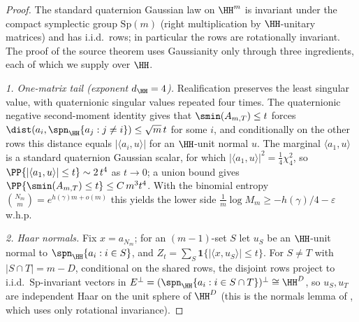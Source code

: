 \begin{proof}
The standard quaternion Gaussian law on $\HH^m$ is invariant under the compact
symplectic group $\mathrm{Sp}(m)$ (right multiplication by $\HH$-unitary matrices)
and has i.i.d.\ rows; in particular the rows are rotationally invariant.  The proof
of the source theorem \cite{ShmaloExtremal2026} uses Gaussianity only through three
ingredients, each of which we supply over $\HH$.

\emph{1. One-matrix tail (exponent $d_\HH=4$).}  Realification preserves the
least singular value, with quaternionic singular values repeated four times.
The quaternionic negative second-moment identity gives that
$\smin(A_{m,T})\le t$ forces $\dist(a_i,\spn_\HH\{a_j:j\ne i\})\le\sqrt m\,t$ for
some $i$, and conditionally on the other rows this distance equals
$|\langle a_i,u\rangle|$ for an $\HH$-unit normal $u$.  The marginal
$\langle a_1,u\rangle$ is a standard quaternion Gaussian scalar, for which
$|\langle a_1,u\rangle|^2=\tfrac14\chi^2_4$, so
$\PP\{|\langle a_1,u\rangle|\le t\}\sim 2\,t^4$ as $t\to0$; a union bound gives
$\PP\{\smin(A_{m,T})\le t\}\le C\,m^{3}t^{4}$.  With the binomial entropy
$\binom{N_m}{m}=e^{h(\gamma)m+o(m)}$ this yields the lower side
$\tfrac1m\log M_m\ge -h(\gamma)/4-\varepsilon$ w.h.p.

\emph{2. Haar normals.}  Fix $x=a_{N_m}$; for an $(m-1)$-set $S$ let $u_S$ be an
$\HH$-unit normal to $\spn_\HH\{a_i:i\in S\}$, and $Z_t=\sum_S\mathbf
1\{|\langle x,u_S\rangle|\le t\}$.  For $S\ne T$ with $|S\cap T|=m-D$, conditional on
the shared rows, the disjoint rows project to i.i.d.\ $\mathrm{Sp}$-invariant
vectors in $E^\perp=(\spn_\HH\{a_i:i\in S\cap T\})^\perp\cong\HH^D$, so $u_S,u_T$ are
independent Haar on the unit sphere of $\HH^D$ (this is the normals lemma of
\cite{ShmaloExtremal2026}, which uses only rotational invariance).


\end{proof}
